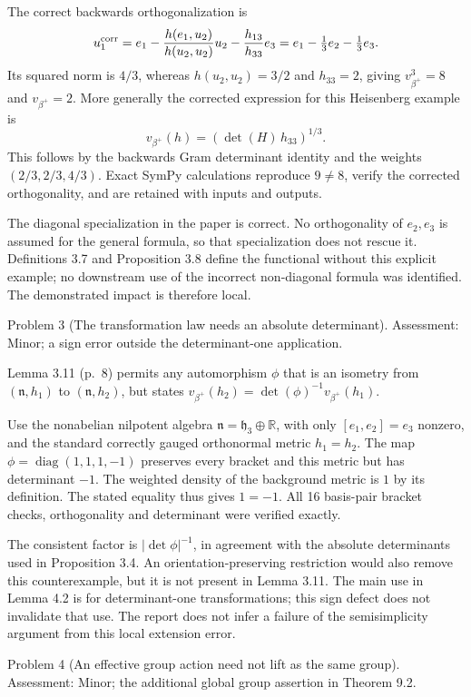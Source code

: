 \documentclass[10pt]{article}
\begin{document}
The correct backwards orthogonalization is \[u_1^{\rm corr}
 =e_1-\frac{h(e_1,u_2)}{h(u_2,u_2)}u_2-\frac{h_{13}}{h_{33}}e_3
 =e_1-\tfrac13e_2-\tfrac13e_3.\] Its squared norm is \(4/3\), whereas \(h(u_2,u_2)=3/2\) and \(h_{33}=2\), giving \(v_{\beta^+}^3=8\) and \(v_{\beta^+}=2\). More generally the corrected expression for this Heisenberg example is \[v_{\beta^+}(h)=(\det(H)\,h_{33})^{1/3}.\] This follows by the backwards Gram determinant identity and the weights \((2/3,2/3,4/3)\). Exact SymPy calculations reproduce \(9\ne8\), verify the corrected orthogonality, and are retained with inputs and outputs.\par
The diagonal specialization in the paper is correct. No orthogonality of \(e_2,e_3\) is assumed for the general formula, so that specialization does not rescue it. Definitions 3.7 and Proposition 3.8 define the functional without this explicit example; no downstream use of the incorrect non-diagonal formula was identified. The demonstrated impact is therefore local.\par
Problem 3 (The transformation law needs an absolute determinant).  Assessment: Minor; a sign error outside the determinant-one application.\par
Lemma 3.11 (p. 8) permits any automorphism \(\phi\) that is an isometry from \((\mathfrak n,h_1)\) to \((\mathfrak n,h_2)\), but states \(v_{\beta^+}(h_2)=\det(\phi)^{-1}v_{\beta^+}(h_1)\).\par
Use the nonabelian nilpotent algebra \(\mathfrak n=\mathfrak h_3\oplus\mathbb R\), with only \([e_1,e_2]=e_3\) nonzero, and the standard correctly gauged orthonormal metric \(h_1=h_2\). The map \(\phi=\operatorname{diag}(1,1,1,-1)\) preserves every bracket and this metric but has determinant \(-1\). The weighted density of the background metric is \(1\) by its definition. The stated equality thus gives \(1=-1\). All 16 basis-pair bracket checks, orthogonality and determinant were verified exactly.\par
The consistent factor is \(|\det\phi|^{-1}\), in agreement with the absolute determinants used in Proposition 3.4. An orientation-preserving restriction would also remove this counterexample, but it is not present in Lemma 3.11. The main use in Lemma 4.2 is for determinant-one transformations; this sign defect does not invalidate that use. The report does not infer a failure of the semisimplicity argument from this local extension error.\par
Problem 4 (An effective group action need not lift as the same group).  Assessment: Minor; the additional global group assertion in Theorem 9.2.\par
\end{document}
